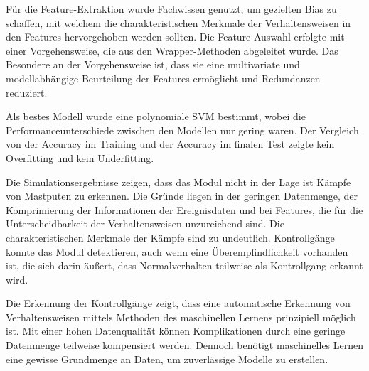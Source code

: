 Für die Feature-Extraktion wurde Fachwissen genutzt, um gezielten Bias zu schaffen, mit welchem die charakteristischen Merkmale der Verhaltensweisen in den Features hervorgehoben werden sollten. Die Feature-Auswahl erfolgte mit einer Vorgehensweise, die aus den Wrapper-Methoden abgeleitet wurde. Das Besondere an der Vorgehensweise ist, dass sie eine multivariate und modellabhängige Beurteilung der Features ermöglicht und Redundanzen reduziert. \par

Als bestes Modell wurde eine polynomiale SVM bestimmt, wobei die Performanceunterschiede zwischen den Modellen nur gering waren. Der Vergleich von der Accuracy im Training und der Accuracy im finalen Test zeigte kein Overfitting und kein Underfitting.\par

Die Simulationsergebnisse zeigen, dass das Modul nicht in der Lage ist Kämpfe von Mastputen zu erkennen. Die Gründe liegen in der geringen Datenmenge, der Komprimierung der Informationen der Ereignisdaten und bei Features, die für die Unterscheidbarkeit der Verhaltensweisen unzureichend sind. Die charakteristischen Merkmale der Kämpfe sind zu undeutlich. Kontrollgänge konnte das Modul detektieren, auch wenn eine Überempfindlichkeit vorhanden ist, die sich darin äußert, dass Normalverhalten teilweise als Kontrollgang erkannt wird. \par

Die Erkennung der Kontrollgänge zeigt, dass eine automatische Erkennung von Verhaltensweisen mittels Methoden des maschinellen Lernens prinzipiell möglich ist. Mit einer hohen Datenqualität können Komplikationen durch eine geringe Datenmenge teilweise kompensiert werden. Dennoch benötigt maschinelles Lernen eine gewisse Grundmenge an Daten, um zuverlässige Modelle zu erstellen. 

